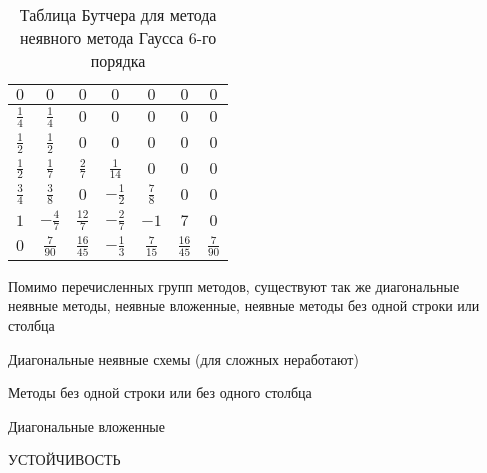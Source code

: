 \begin{table}    
    \caption{Таблица Бутчера для метода неявного метода Гаусса 6-го порядка}
    \begin{tabular}{|c|c|c|c|c|c|c|}
    \hline
    $0$ & $0$ & $0$ & $0$ & $0$ & $0$ & $0$\\
    \hline
    $\frac{1}{4}$ & $\frac{1}{4}$ & $0$ & $0$ & $0$ & $0$ & $0$\\
    \hline
    $\frac{1}{2}$ & $\frac{1}{2}$ & $0$ & $0$ & $0$ & $0$ & $0$\\
    \hline
    $\frac{1}{2}$ & $\frac{1}{7}$ & $\frac{2}{7}$ & $\frac{1}{14}$ & $0$ & $0$ & $0$\\
    \hline
    $\frac{3}{4}$ & $\frac{3}{8}$ & $0$ & $-\frac{1}{2}$ & $\frac{7}{8}$ & $0$ & $0$\\
    \hline
    $1$ & $-\frac{4}{7}$ & $\frac{12}{7}$ & $-\frac{2}{7}$ & $-1$ & $7$ & $0$\\
    \hline
    $0$ & \cellcolor{lightgray} $\frac{7}{90}$ & \cellcolor{lightgray} $\frac{16}{45}$ & \cellcolor{lightgray} $-\frac{1}{3}$ & \cellcolor{lightgray} $\frac{7}{15}$ & \cellcolor{lightgray} $\frac{16}{45}$ & \cellcolor{lightgray} $\frac{7}{90}$\\
    \hline
    \end{tabular}
    \label{tab:RK6}
\end{table}

Помимо перечисленных групп методов, существуют так же диагональные неявные методы, неявные вложенные, неявные методы без одной строки
или столбца



Диагональные неявные схемы (для сложных неработают)

Методы без одной строки или без одного столбца

Диагональные вложенные

УСТОЙЧИВОСТЬ



